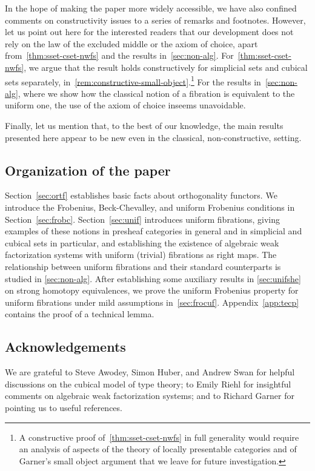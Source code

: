\documentclass[reqno,10pt,a4paper,oneside,draft]{amsart}
\begin{document}
In the hope of making the paper more widely accessible, we have also
confined comments on constructivity issues to a series of remarks and footnotes.
However,
let us point out here for the interested readers  that
 our development does not rely on the law of the excluded middle or the axiom of choice, apart  from~\cref{thm:sset-cset-nwfs} and the results in~\cref{sec:non-alg}. For~\cref{thm:sset-cset-nwfs}, we argue that the result holds constructively for simplicial sets and
cubical sets separately, in~\cref{rem:constructive-small-object}.\footnote{A constructive proof 
of~\cref{thm:sset-cset-nwfs} in full generality would require an analysis of aspects
of the theory of locally presentable categories and of Garner's small object argument 
that we leave for future investigation.} For the results in~\cref{sec:non-alg}, where we show how the classical notion of a fibration is equivalent to the uniform one, the use of the axiom of choice inseems unavoidable.

Finally, let us mention that, to the best of our knowledge, 
the main results presented here appear to be new even 
in the classical, \ie non-constructive, setting.


\subsection*{Organization of the paper}
Section~\ref{sec:ortf} establishes basic facts about orthogonality functors. 
We introduce the Frobenius, Beck-Chevalley, and uniform Frobenius conditions in Section~\ref{sec:frobc}. Section~\ref{sec:unif} introduces uniform fibrations, giving examples of these notions in presheaf categories in general and in simplicial and cubical sets in particular,
and establishing the existence of algebraic weak factorization systems with uniform (trivial) fibrations as right maps.
The relationship between uniform fibrations and their standard counterparts
 is studied in \cref{sec:non-alg}.
After establishing some auxiliary results in \cref{sec:unifshe} on strong homotopy equivalences, we prove the uniform Frobenius property for 
uniform fibrations under mild assumptions in~\cref{sec:frocuf}.
Appendix~\ref{app:tecp} contains the proof of a technical lemma.

\subsection*{Acknowledgements}
We are grateful to Steve Awodey, Simon Huber, and Andrew Swan for helpful discussions on the cubical model of type theory; to Emily Riehl for insightful comments on algebraic weak factorization systems; and to Richard Garner for pointing us to useful references.
\end{document}
